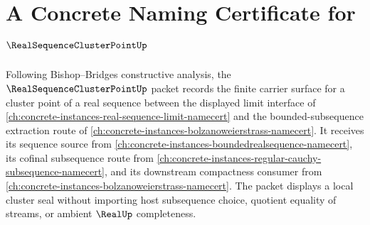 \chapter{A Concrete Naming Certificate for $\RealSequenceClusterPointUp$}
\label{ch:concrete-instances-real-sequence-cluster-point-namecert}

Following Bishop--Bridges constructive analysis, the $\RealSequenceClusterPointUp$ packet records the finite carrier surface for a cluster point of a real sequence between the displayed limit interface of \autoref{ch:concrete-instances-real-sequence-limit-namecert} and the bounded-subsequence extraction route of \autoref{ch:concrete-instances-bolzanoweierstrass-namecert}. It receives its sequence source from \autoref{ch:concrete-instances-boundedrealsequence-namecert}, its cofinal subsequence route from \autoref{ch:concrete-instances-regular-cauchy-subsequence-namecert}, and its downstream compactness consumer from \autoref{ch:concrete-instances-bolzanoweierstrass-namecert}. The packet displays a local cluster seal without importing host subsequence choice, quotient equality of streams, or ambient $\RealUp$ completeness.


